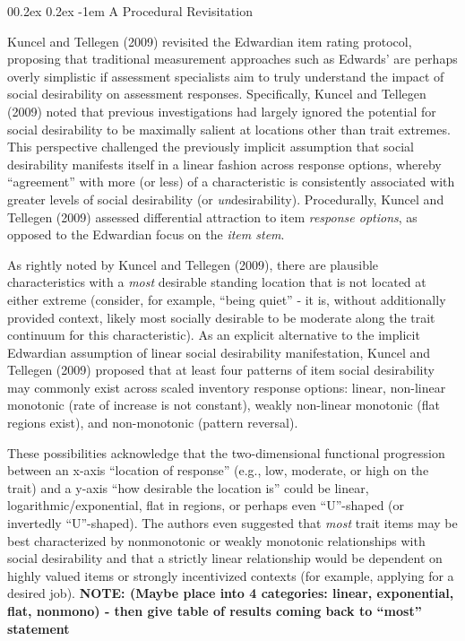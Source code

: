 \documentclass[
  ,jou]{apa6}
\makeatletter
\let\oldparagraph\paragraph
\renewcommand{\paragraph}[1]{\oldparagraph{#1}\mbox{}}
\renewcommand{\paragraph}{\@startsection{paragraph}{4}{\parindent}%
  {0\baselineskip \@plus 0.2ex \@minus 0.2ex}%
  {-1em}%
  {\normalfont\normalsize\bfseries\itshape\typesectitle}}
\makeatother
\begin{document}
\hypertarget{a-procedural-revisitation}{%
\paragraph{A Procedural Revisitation}\label{a-procedural-revisitation}}

Kuncel and Tellegen (2009) revisited the Edwardian item rating protocol, proposing that traditional measurement approaches such as Edwards' are perhaps overly simplistic if assessment specialists aim to truly understand the impact of social desirability on assessment responses. Specifically, Kuncel and Tellegen (2009) noted that previous investigations had largely ignored the potential for social desirability to be maximally salient at locations other than trait extremes. This perspective challenged the previously implicit assumption that social desirability manifests itself in a linear fashion across response options, whereby ``agreement'' with more (or less) of a characteristic is consistently associated with greater levels of social desirability (or \emph{un}desirability). Procedurally, Kuncel and Tellegen (2009) assessed differential attraction to item \emph{response options}, as opposed to the Edwardian focus on the \emph{item stem}.

As rightly noted by Kuncel and Tellegen (2009), there are plausible characteristics with a \emph{most} desirable standing location that is not located at either extreme (consider, for example, ``being quiet'' - it is, without additionally provided context, likely most socially desirable to be moderate along the trait continuum for this characteristic). As an explicit alternative to the implicit Edwardian assumption of linear social desirability manifestation, Kuncel and Tellegen (2009) proposed that at least four patterns of item social desirability may commonly exist across scaled inventory response options: linear, non-linear monotonic (rate of increase is not constant), weakly non-linear monotonic (flat regions exist), and non-monotonic (pattern reversal).

These possibilities acknowledge that the two-dimensional functional progression between an x-axis ``location of response'' (e.g., low, moderate, or high on the trait) and a y-axis ``how desirable the location is'' could be linear, logarithmic/exponential, flat in regions, or perhaps even ``U''-shaped (or invertedly ``U''-shaped). The authors even suggested that \emph{most} trait items may be best characterized by nonmonotonic or weakly monotonic relationships with social desirability and that a strictly linear relationship would be dependent on highly valued items or strongly incentivized contexts (for example, applying for a desired job). \textbf{NOTE: (Maybe place into 4 categories: linear, exponential, flat, nonmono) - then give table of results coming back to ``most'' statement}
\end{document}
